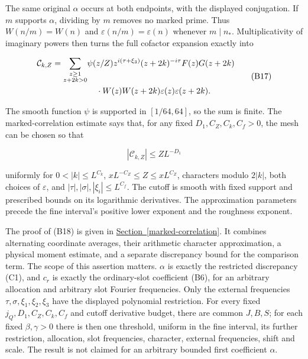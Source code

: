 The same original \(\alpha\) occurs at both endpoints, with the
displayed conjugation. If \(m\) supports \(\alpha\), dividing by \(m\)
removes no marked prime. Thus \(W(n/m)=W(n)\) and
\(\varepsilon(n/m)=\varepsilon(n)\) whenever \(m\mid n_*\).
Multiplicativity of imaginary powers then turns the full cofactor
expansion exactly into

\[
\begin{aligned}
\mathcal C_{k,Z}=
\sum_{\substack{z\ge1\\z+2k>0}}
&\psi(z/Z)z^{i(\tau+\xi_3)}(z+2k)^{-i\tau}
 F(z)G(z+2k)\\
&\hspace{4mm}\cdot W(z)W(z+2k)\varepsilon(z)\varepsilon(z+2k).
\end{aligned} \tag{B17}
\]

The smooth function \(\psi\) is supported in \([1/64,64]\), so the sum
is finite. The marked-correlation estimate says that, for any fixed
\(D_1,C_Z,C_k,C_f>0\), the mesh can be chosen so that

\[
|\mathcal C_{k,Z}|\le ZL^{-D_1} \tag{B18}
\]

uniformly for \(0<|k|\le L^{C_k}\), \(xL^{-C_Z}\le Z\le xL^{C_Z}\),
characters modulo \(2|k|\), both choices of \(\varepsilon\), and
\(|\tau|,|\sigma|,|\xi_i|\le L^{C_f}\). The cutoff is smooth with fixed
support and prescribed bounds on its logarithmic derivatives. The
approximation parameters precede the fine interval's positive lower
exponent and the roughness exponent.

The proof of (B18) is given in
\protect\hyperlink{marked-correlation}{Section~\ref{marked-correlation}}.
It combines alternating coordinate averages, their arithmetic character
approximation, a physical moment estimate, and a separate discrepancy
bound for the comparison term. The scope of this assertion matters.
\(\alpha\) is exactly the restricted discrepancy (C1), and \(c_r\) is
exactly the ordinary-slot coefficient (B6), for an arbitrary allocation
and arbitrary slot Fourier frequencies. Only the external frequencies
\(\tau,\sigma,\xi_1,\xi_2,\xi_3\) have the displayed polynomial
restriction. For every fixed \(j_Q,D_1,C_Z,C_k, C_f\) and cutoff
derivative budget, there are common \(J,B,S\); for each fixed
\(\beta,\gamma>0\) there is then one threshold, uniform in the fine
interval, its further restriction, allocation, slot frequencies,
character, external frequencies, shift and scale. The result is not
claimed for an arbitrary bounded first coefficient \(\alpha\).


